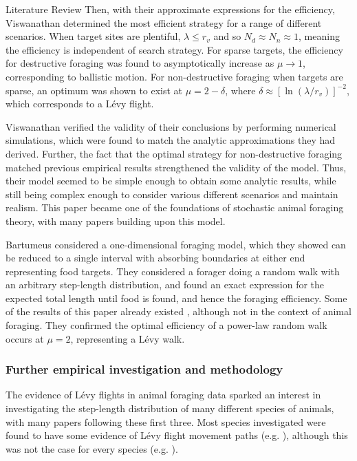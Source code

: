 \begin{section}{Literature Review \label{sec:litreview}}
Then, with their approximate expressions for the efficiency, Viswanathan \etal \cite{Viswanathan_1999} determined the most efficient strategy for a range of different scenarios.
When target sites are plentiful, $\lambda \leq r_v$ and so $N_d \approx N_{n} \approx 1$, meaning the efficiency is independent of search strategy.
For sparse targets, the efficiency for destructive foraging was found to asymptotically increase as $\mu \to 1$, corresponding to ballistic motion.
For non-destructive foraging when targets are sparse, an optimum was shown to exist at $\mu = 2 - \delta$, where $\delta \approx [\ln(\lambda/r_v)]^{-2}$, which corresponds to a L\'{e}vy flight.

Viswanathan \etal \cite{Viswanathan_1999} verified the validity of their conclusions by performing numerical simulations, which were found to match the analytic approximations they had derived.
Further, the fact that the optimal strategy for non-destructive foraging matched previous empirical results \cite{Cole_1995,Viswanathan_1996} strengthened the validity of the model.
Thus, their model seemed to be simple enough to obtain some analytic results, while still being complex enough to consider various different scenarios and maintain realism.
This paper became one of the foundations of stochastic animal foraging theory, with many papers building upon this model.

Bartumeus \etal \cite{Bartumeus_2013} considered a one-dimensional foraging model, which they showed can be reduced to a single interval with absorbing boundaries at either end representing food targets. They considered a forager doing a random walk with an arbitrary step-length distribution, and found an exact expression for the expected total length until food is found, and hence the foraging efficiency. Some of the results of this paper already existed \cite{Buldyrev_2001_avetime,Buldyrev_2001_prop}, although not in the context of animal foraging. They confirmed the optimal efficiency of a power-law random walk occurs at $\mu=2$, representing a L\'{e}vy walk.

\subsubsection{Further empirical investigation and methodology}

The evidence of L\'{e}vy flights in animal foraging data \cite{Cole_1995,Viswanathan_1996,Viswanathan_1999} sparked an interest in investigating the step-length distribution of many different species of animals, with many papers following these first three.
Most species investigated were found to have some evidence of L\'{e}vy flight movement paths (e.g. \cite{Marell_2002,Ayala_Orozco_2004,Reynolds_2007_moths,Reynolds_2007_bees,Sims_2008}), although this was not the case for every species (e.g. \cite{Austin_2004}). 


\end{section}
